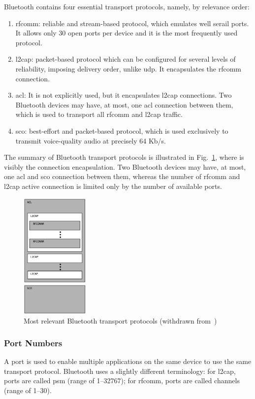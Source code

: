 Bluetooth contains four essential transport protocols, namely, by relevance
order:
\begin{enumerate}
\item \gls{rfcomm}: reliable and stream-based protocol, which emulates well
  serail ports. It allows only 30 open ports per device and it is the most
  frequently used protocol.
\item \gls{l2cap}: packet-based protocol which can be configured for several
  levels of reliability, imposing delivery order, unlike \gls{udp}. It
  encapsulates the \gls{rfcomm} connection.
\item \gls{acl}: It is not explicitly used, but it encapsulates \gls{l2cap}
  connections. Two Bluetooth devices may have, at most, one \gls{acl} connection
  between them, which is used to transport all \gls{rfcomm} and \gls{l2cap}
  traffic.
\item \gls{sco}: best-effort and packet-based protocol, which is used
  exclusively to transmit voice-quality audio at precisely 64 Kb/s.
\end{enumerate}
The summary of Bluetooth transport protocols is illustrated in
Fig.~\ref{fig:bt-transport-protocols-summary}, where is visibly the connection
encapsulation. Two Bluetooth devices may have, at most, one \gls{acl} and \gls{sco} connection
between them, whereas the number of \gls{rfcomm} and \gls{l2cap} active
connection is limited only by the number of available ports.
\begin{figure}[!hbt]
\centering
    \includegraphics[width=0.3\textwidth]{./img/bt-transport-protocols-summary.png}
  \caption{Most relevant Bluetooth transport protocols (withdrawn from~\cite{huang2007bluetooth})}%
\label{fig:bt-transport-protocols-summary}
\end{figure}
%
\subsubsection{Port Numbers}%
\label{sec:bt-port-nrs}
%
A port is used to enable multiple applications on the same device to use the
same transport protocol. Bluetooth uses a slightly different terminology: for
\gls{l2cap}, ports are called \gls{psm} (range of 1--32767); for
\gls{rfcomm}, ports are called channels (range of 1--30).


